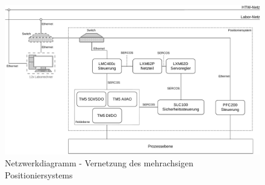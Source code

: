 \documentclass[../../../Bachelorarbeit.tex]{subfiles}
\begin{document}
\begin{figure}[H]
    \centering
    \includegraphics[width=\textwidth]{Images/Netzwerkdiagramm.pdf}
    \caption[Netzwerkstruktur]{Netzwerkdiagramm - Vernetzung des mehrachsigen Positioniersystems}
    \label{fig:my-img62}
\end{figure}

\end{document}
